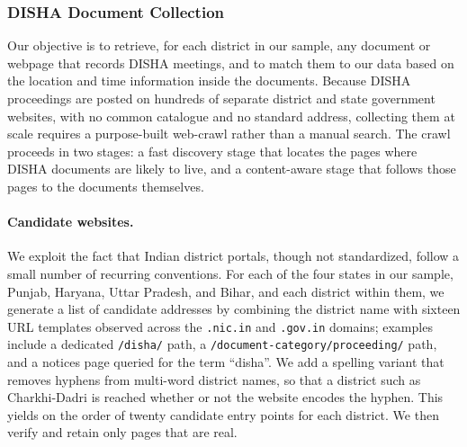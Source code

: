 \documentclass[12pt]{article}
\begin{document}
{\subsubsection{DISHA Document Collection}\label{ssec:disha_app}

Our objective is to retrieve, for each district in our sample, any document or
webpage that records DISHA meetings, and to match them to our data based on the
location and time information inside the documents. Because DISHA proceedings
are posted on hundreds of separate district and state government websites, with
no common catalogue and no standard address, collecting them at scale requires a
purpose-built web-crawl rather than a manual search. The crawl proceeds in two
stages: a fast discovery stage that locates the pages where DISHA documents are
likely to live, and a content-aware stage that follows those pages to the
documents themselves.

\paragraph{Candidate websites.} We exploit the fact that Indian district
portals, though not standardized, follow a small number of recurring
conventions. For each of the four states in our sample, Punjab, Haryana, Uttar
Pradesh, and Bihar, and each district within them, we generate a list of
candidate addresses by combining the district name with sixteen URL templates
observed across the \texttt{.nic.in} and \texttt{.gov.in} domains; examples
include a dedicated \texttt{/disha/} path, a
\texttt{/document-category/proceeding/} path, and a notices page queried for the
term ``disha''. We add a spelling variant that removes hyphens from multi-word
district names, so that a district such as Charkhi-Dadri is reached whether or
not the website encodes the hyphen. This yields on the order of twenty candidate
entry points for each district. We then verify and retain only pages that are real. 


}
\end{document}
